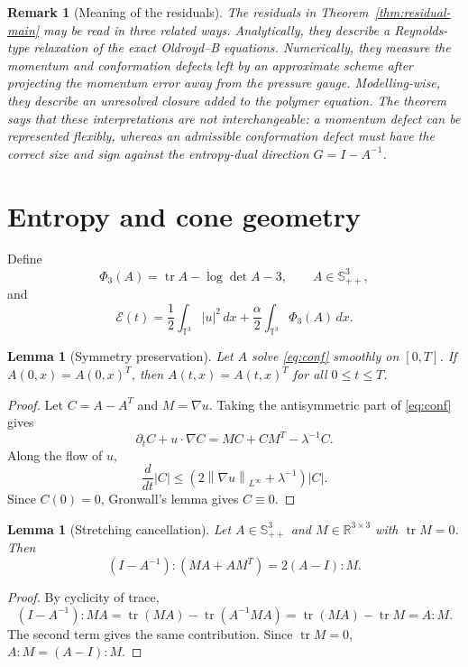 \documentclass[10pt,a4paper]{amsart}
\numberwithin{equation}{section}
\newtheorem{lemma}[theorem]{Lemma}
\newtheorem{remark}[theorem]{Remark}
\newcommand{\T}{\mathbb T}
\newcommand{\R}{\mathbb R}
\newcommand{\Id}{I}
\newcommand{\Spp}{\mathbb S_{++}}
\newcommand{\tr}{\operatorname{tr}}
\newcommand{\calE}{\mathcal E}
\newcommand{\norm}[1]{\left\lVert #1\right\rVert}
\begin{document}
\begin{remark}[Meaning of the residuals]
The residuals in Theorem~\ref{thm:residual-main} may be read in three related
ways.  Analytically, they describe a Reynolds-type relaxation of the exact
Oldroyd--B equations.  Numerically, they measure the momentum and conformation
defects left by an approximate scheme after projecting the momentum error away
from the pressure gauge.  Modelling-wise, they describe an unresolved closure
added to the polymer equation.  The theorem says that these interpretations
are not interchangeable: a momentum defect can be represented flexibly, whereas
an admissible conformation defect must have the correct size and sign against
the entropy-dual direction \(G=\Id-A^{-1}\).
\end{remark}

\section{Entropy and cone geometry}

Define
\[
  \Phi_3(A)=\tr A-\log\det A-3,\qquad A\in\Spp^3,
\]
and
\[
  \calE(t)=
  \frac12\int_{\T^3}|u|^2\,dx
  +\frac{\alpha}{2}\int_{\T^3}\Phi_3(A)\,dx .
\]

\begin{lemma}[Symmetry preservation]
\label{lem:symmetry}
Let \(A\) solve \eqref{eq:conf} smoothly on \([0,T]\).  If
\(A(0,x)=A(0,x)^T\), then \(A(t,x)=A(t,x)^T\) for all \(0\le t\le T\).
\end{lemma}

\begin{proof}
Let \(C=A-A^T\) and \(M=\nabla u\).  Taking the antisymmetric part of
\eqref{eq:conf} gives
\[
  \partial_tC+u\cdot\nabla C
  =
  MC+CM^T-\lambda^{-1}C .
\]
Along the flow of \(u\),
\[
  \frac{d}{dt}|C|
  \le
  (2\norm{\nabla u}_{L^\infty}+\lambda^{-1})|C|.
\]
Since \(C(0)=0\), Gronwall's lemma gives \(C\equiv0\).
\end{proof}

\begin{lemma}[Stretching cancellation]
\label{lem:cancellation}
Let \(A\in\Spp^3\) and \(M\in\R^{3\times3}\) with \(\tr M=0\).  Then
\[
  (\Id-A^{-1}):(MA+AM^T)=2(A-\Id):M .
\]
\end{lemma}

\begin{proof}
By cyclicity of trace,
\[
  (\Id-A^{-1}):MA=\tr(MA)-\tr(A^{-1}MA)=\tr(MA)-\tr M=A:M .
\]
The second term gives the same contribution.  Since \(\tr M=0\),
\(A:M=(A-\Id):M\).
\end{proof}
\end{document}
